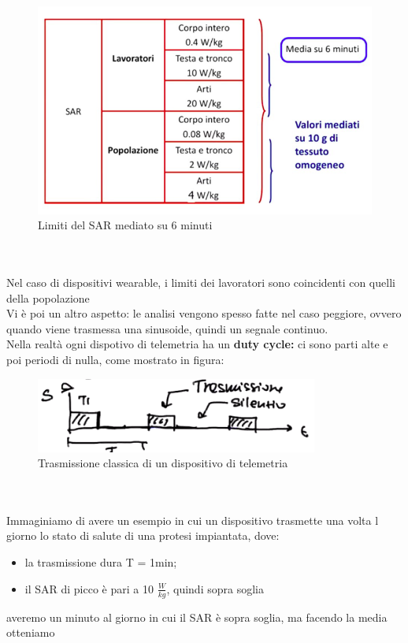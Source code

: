 \documentclass[oneside, 12pt]{extbook}
\begin{document}
\begin{figure}
	\includegraphics[scale=0.5]{immagini/limiti_sar.png}
	\caption{Limiti del SAR mediato su 6 minuti}
\end{figure}
\\\\Nel caso di dispositivi wearable, i limiti dei lavoratori sono coincidenti con quelli della popolazione\\Vi è poi un altro aspetto: le analisi vengono spesso fatte nel caso peggiore, ovvero quando viene trasmessa una sinusoide, quindi un segnale continuo.\\Nella realtà ogni dispotivo di telemetria ha un \textbf{duty cycle:} ci  sono parti alte e poi periodi di nulla, come mostrato in figura:
\begin{figure}[!h]
	\includegraphics[scale=1.5]{immagini/duty_cycle.png}
	\caption{Trasmissione classica di un dispositivo di telemetria}
\end{figure}
\\\\Immaginiamo di avere un esempio in cui un dispositivo trasmette una volta l giorno lo stato di salute di una protesi impiantata, dove:
\begin{itemize}
	\item la trasmissione dura T = 1min;
	\item il SAR di picco è pari a 10 $\frac{W}{kg}$, quindi sopra soglia
\end{itemize}
averemo un minuto al giorno in cui il SAR è sopra soglia, ma facendo la media otteniamo 
\end{document}
